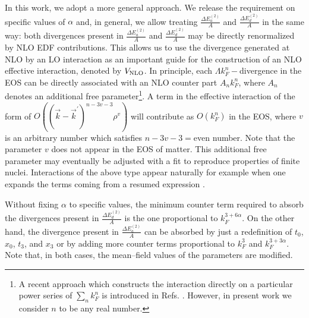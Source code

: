 \documentclass[aps,11pt,prc,preprint,superscriptaddress,nofootinbib]{revtex4}
\begin{document}
 In this work, we adopt a more general approach. We release the
requirement on specific values of $\alpha $ and, in general, we allow treating 
$\frac{\Delta E_{a}^{(2)}%
}{A}$  and $\frac{\Delta E_{d}^{(2)}}{A}$ in the same way: 
both divergences present in 
$\frac{\Delta E_{a}^{(2)}}{A}$ and $\frac{\Delta
E_{d}^{(2)}}{A}$ may be directly renormalized by NLO EDF
contributions. This allows us to use the divergence generated at NLO by 
an LO interaction  
as an important guide
for the construction of an NLO effective interaction, denoted by $V_{\rm NLO}$. In principle, each $%
\Lambda k_F^{n}-$divergence in the EOS can be directly associated with an NLO
counter part $A_{n}k_F^{n}$, where $A_{n}$ denotes an additional free
parameter\footnote{A recent approach which constructs the interaction directly on a particular power series of $\sum_n k_F^n$ is introduced in Refs. \cite{kids,kids2}. However, in present work we consider $n$ to be any real number.}. 
A term in 
the effective interaction of the 
form of $O\left( (\vec{k}-\vec{k}^{\prime
})^{n-3v-3}\rho ^{v}\right) $ will contribute as $O\left( k_F^{n}\right) $
in the EOS, where $v$ is an arbitrary number which satisfies $n-3v-3=$even number. Note that the parameter $v$ does not appear in the EOS of matter. This additional free parameter may eventually  be adjusted with a fit   
 to reproduce properties of finite nuclei. 
 Interactions of the above type
appear naturally for example when one expands the terms coming from a resumed expression 
 \cite{steele,yglo,schafer,kaiser1}. 

Without fixing $\alpha$ to specific values, the minimum counter term required to absorb the divergences
present in $\frac{\Delta E_{d}^{(2)}}{A}$ is the one
proportional to $k_F^{3+6\alpha }$. On the other hand, the divergence
present in $\frac{\Delta E_{a}^{(2)}}{A}$ can be absorbed
by just a redefinition of $t_{0}$, $x_{0}$, $t_{3}$, and $x_{3}$ or by adding more
counter terms proportional to $k_F^{3}$ and $k_F^{3+3\alpha }$. Note that, in
both cases, the mean--field values of the parameters are modified.
\end{document}
